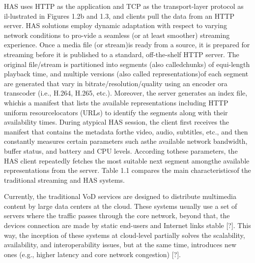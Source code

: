 HAS uses HTTP as the application and TCP as the transport-layer protocol as il-lustrated in Figures 1.2b and 1.3, and clients pull the data from an HTTP server. HAS solutions employ dynamic adaptation with respect to varying network conditions to pro-vide a seamless (or at least smoother) streaming experience. Once a media file (or stream)is ready from a source, it is prepared for streaming before it is published to a standard, off-the-shelf HTTP server. The original file/stream is partitioned into segments (also calledchunks) of equi-length playback time, and multiple versions (also called representations)of each segment are generated that vary in bitrate/resolution/quality using an encoder ora transcoder (i.e., H.264, H.265, etc.). Moreover, the server generates an index file, whichis a manifest that lists the available representations including HTTP uniform resourcelocators (URLs) to identify the segments along with their availability times. During atypical HAS session, the client first receives the manifest that contains the metadata forthe video, audio, subtitles, etc., and then constantly measures certain parameters such asthe available network bandwidth, buffer status, and battery and CPU levels. According tothese parameters, the HAS client repeatedly fetches the most suitable next segment amongthe available representations from the server. Table 1.1 compares the main characteristicsof the traditional streaming and HAS systems.


Currently, the traditional VoD services are designed to distribute multimedia content by large data centers at the cloud. These systems usually use a set of servers where the traffic passes through the core network, beyond that, the devices connection are made by static end-users and Internet links stable [?]. This way, the inception of these systems at cloud-level partially solves the scalability, availability, and interoperability issues, but at the same time, introduces new ones (e.g., higher latency and core network congestion) [?].




